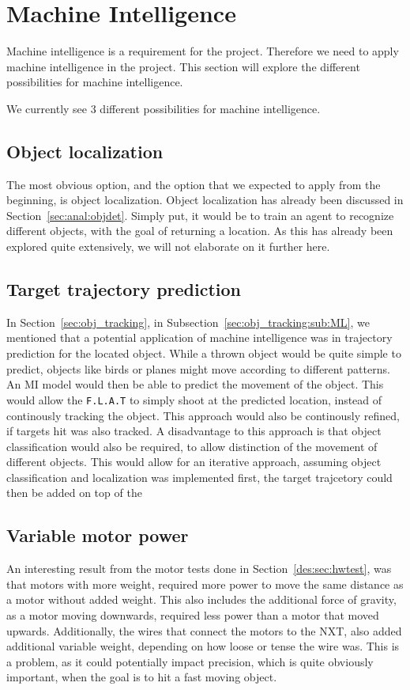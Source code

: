 \section{Machine Intelligence}\label{Design:MI}
Machine intelligence is a requirement for the project.
Therefore we need to apply machine intelligence in the project.
This section will explore the different possibilities for machine intelligence.

We currently see 3 different possibilities for machine intelligence.

\subsection{Object localization}
The most obvious option, and the option that we expected to apply from the beginning, is object localization.
Object localization has already been discussed in Section~\ref{sec:anal:objdet}.
Simply put, it would be to train an agent to recognize different objects, with the goal of returning a location.
As this has already been explored quite extensively, we will not elaborate on it further here.

\subsection{Target trajectory prediction}
In Section~\ref{sec:obj_tracking}, in Subsection~\ref{sec:obj_tracking:sub:ML}, we mentioned that a potential application of machine intelligence was in trajectory prediction for the located object.
While a thrown object would be quite simple to predict, objects like birds or planes might move according to different patterns.
An MI model would then be able to predict the movement of the object.
This would allow the \texttt{F.L.A.T} to simply shoot at the predicted location, instead of continously tracking the object.
This approach would also be continously refined, if targets hit was also tracked.
A disadvantage to this approach is that object classification would also be required, to allow distinction of the movement of different objects.
This would allow for an iterative approach, assuming object classification and localization was implemented first, the target trajcetory could then be added on top of the


\subsection{Variable motor power}
An interesting result from the motor tests done in Section~\ref{des:sec:hwtest}, was that motors with more weight, required more power to move the same distance as a motor without added weight.
This also includes the additional force of gravity, as a motor moving downwards, required less power than a motor that moved upwards.
Additionally, the wires that connect the motors to the NXT, also added additional variable weight, depending on how loose or tense the wire was.
This is a problem, as it could potentially impact precision, which is quite obviously important, when the goal is to hit a fast moving object.

